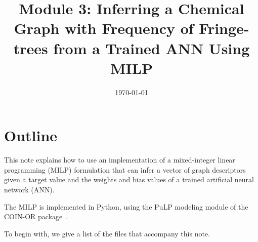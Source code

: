 \documentclass[11pt, titlepage, dvipdfmx, twoside]{article}
\title{\huge{Module 3: Inferring a Chemical Graph with Frequency of Fringe-trees
			  from a Trained ANN Using MILP}}
\author{\project}
\begin{document}
\makeatletter 
\let\c@lstlisting\c@figure
\makeatother

\date{\today}

\maketitle


\thispagestyle{empty}
\tableofcontents
\clearpage



\section{Outline}
\label{sec:Intro}

This note explains how to use an implementation of a mixed-integer
linear programming (MILP) formulation that can infer
a vector of graph descriptors given a target value and the 
weights and bias values of a trained artificial neural network (ANN).

The MILP is implemented in Python, 
using the PuLP modeling module of the 
COIN-OR package~\cite{PuLP1,PuLP2,PuLP3,PuLP4}.

To begin with, we give a list of the files that accompany this note.
\end{document}
